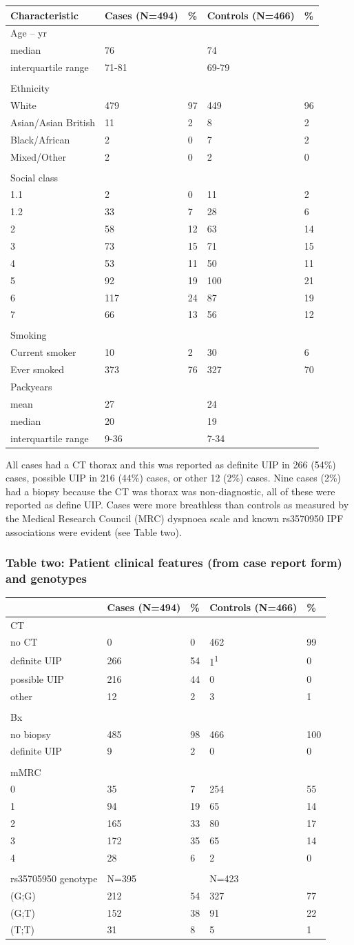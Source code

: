 \documentclass[
]{article}
\begin{document}
\begin{longtable}[]{@{}lllll@{}}
\toprule
Characteristic & Cases (N=494) & \% & Controls (N=466) &
\%\tabularnewline
\midrule
\endhead
Age -- yr & & & &\tabularnewline
median & 76 & & 74 &\tabularnewline
interquartile range & 71-81 & & 69-79 &\tabularnewline
& & & &\tabularnewline
Ethnicity & & & &\tabularnewline
White & 479 & 97 & 449 & 96\tabularnewline
Asian/Asian British & 11 & 2 & 8 & 2\tabularnewline
Black/African & 2 & 0 & 7 & 2\tabularnewline
Mixed/Other & 2 & 0 & 2 & 0\tabularnewline
& & & &\tabularnewline
Social class & & & &\tabularnewline
1.1 & 2 & 0 & 11 & 2\tabularnewline
1.2 & 33 & 7 & 28 & 6\tabularnewline
2 & 58 & 12 & 63 & 14\tabularnewline
3 & 73 & 15 & 71 & 15\tabularnewline
4 & 53 & 11 & 50 & 11\tabularnewline
5 & 92 & 19 & 100 & 21\tabularnewline
6 & 117 & 24 & 87 & 19\tabularnewline
7 & 66 & 13 & 56 & 12\tabularnewline
& & & &\tabularnewline
Smoking & & & &\tabularnewline
Current smoker & 10 & 2 & 30 & 6\tabularnewline
Ever smoked & 373 & 76 & 327 & 70\tabularnewline
Packyears & & & &\tabularnewline
mean & 27 & & 24 &\tabularnewline
median & 20 & & 19 &\tabularnewline
interquartile range & 9-36 & & 7-34 &\tabularnewline
\bottomrule
\end{longtable}

All cases had a CT thorax and this was reported as definite UIP in 266
(54\%) cases, possible UIP in 216 (44\%) cases, or other 12 (2\%) cases.
Nine cases (2\%) had a biopsy because the CT was thorax was
non-diagnostic, all of these were reported as define UIP. Cases were
more breathless than controls as measured by the Medical Research
Council (MRC) dyspnoea scale and known rs3570950 IPF associations were
evident (see Table two).

\hypertarget{table-two-patient-clinical-features-from-case-report-form-and-genotypes}{%
\subsubsection{Table two: Patient clinical features (from case report
form) and
genotypes}\label{table-two-patient-clinical-features-from-case-report-form-and-genotypes}}

\begin{longtable}[]{@{}lllll@{}}
\toprule
& Cases (N=494) & \% & Controls (N=466) & \%\tabularnewline
\midrule
\endhead
CT & & & &\tabularnewline
no CT & 0 & 0 & 462 & 99\tabularnewline
definite UIP & 266 & 54 & 1\textsuperscript{1} & 0\tabularnewline
possible UIP & 216 & 44 & 0 & 0\tabularnewline
other & 12 & 2 & 3 & 1\tabularnewline
& & & &\tabularnewline
Bx & & & &\tabularnewline
no biopsy & 485 & 98 & 466 & 100\tabularnewline
definite UIP & 9 & 2 & 0 & 0\tabularnewline
& & & &\tabularnewline
mMRC & & & &\tabularnewline
0 & 35 & 7 & 254 & 55\tabularnewline
1 & 94 & 19 & 65 & 14\tabularnewline
2 & 165 & 33 & 80 & 17\tabularnewline
3 & 172 & 35 & 65 & 14\tabularnewline
4 & 28 & 6 & 2 & 0\tabularnewline
& & & &\tabularnewline
rs35705950 genotype & N=395 & & N=423 &\tabularnewline
(G;G) & 212 & 54 & 327 & 77\tabularnewline
(G;T) & 152 & 38 & 91 & 22\tabularnewline
(T;T) & 31 & 8 & 5 & 1\tabularnewline
\bottomrule
\end{longtable}
\end{document}
